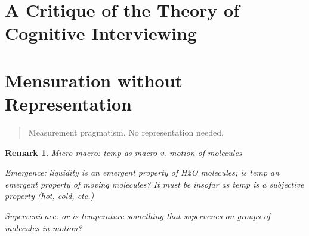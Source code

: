 \documentclass[11pt,twoside]{article}
\newtheorem{remark}{Remark}
\begin{document}
\cite{maynard_diversity_1991} \\
\cite{maynard_toward_2000} \\
\cite{price_true_question_1983} \\
\cite{price_expressivism_2013} \\
\cite{price_naturalism_2013} \\
\cite{price_pluralism_2013} \\
\cite{price_two_2013} \\
\cite{putnam_representation_1991} \\
\cite{putnam_collapse_2002} \\
\cite{putnam_three_2009}
\cite{rorty_method_1981} \\
\cite{rorty_representation_1988} \\
\cite{rorty_PMN} \\
\cite{schatzki_practice_2001} \\
\cite{sellars_empiricism_1997} \\
\cite{tate_foucault_2007} \\
\cite{weiss_reading_2009} \\
\cite{winship_ethnomethodology_2010} \\
\cite{zimmerman_review_1994}

\section{A Critique of the Theory of Cognitive Interviewing}

\begin{abstract}
  
\end{abstract}

\section{Mensuration without Representation}

\begin{abstract}
Measurement pragmatism.  No representation needed.
\end{abstract}

\begin{remark}

Micro-macro:  temp as macro v. motion of molecules

Emergence: liquidity is an emergent property of H2O molecules; is temp
an emergent property of moving molecules?  It must be insofar as temp
is a subjective property (hot, cold, etc.)

Supervenience: or is temperature something that supervenes on groups
of molecules in motion?

\end{remark}
\end{document}
